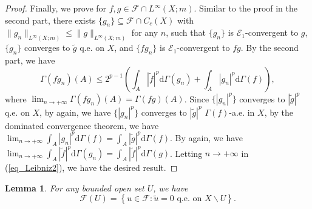 \documentclass[11pt,a4paper]{article}
\numberwithin{equation}{section}
\theoremstyle{plain}
\newtheorem{lemma}[theorem]{Lemma}
\theoremstyle{definition}
\begin{document}
\begin{proof}
Finally, we prove for $f,g\in\mathcal{F}\cap L^\infty(X;m)$. Similar to the proof in the second part, there exists $\{g_n\}\subseteq\mathcal{F}\cap C_c(X)$ with $\lVert {g_n}\rVert_{L^\infty(X;m)}\le \lVert {g}\rVert_{L^\infty(X;m)}$ for any $n$, such that $\{g_n\}$ is $\mathcal{E}_1$-convergent to $g$, $\{g_n\}$ converges to $\widetilde{g}$ q.e. on $X$, and $\{fg_n\}$ is $\mathcal{E}_1$-convergent to $fg$. By the second part, we have
\begin{equation}\label{eq_Leibniz2}
\Gamma(fg_n)(A)\le2^{p-1}\left(\int_A|\widetilde{f}|^p\mathrm{d}\Gamma(g_n)+\int_A|g_n|^p\mathrm{d}\Gamma(f)\right),
\end{equation}
where $\lim_{n\to+\infty}\Gamma(fg_n)(A)=\Gamma(fg)(A)$. Since $\{|g_n|^p\}$ converges to $|\widetilde{g}|^p$ q.e. on $X$, by \cite[Proposition 8.12]{Yan25a} again, we have $\{|g_n|^p\}$ converges to $|\widetilde{g}|^p$ $\Gamma(f)$-a.e. in $X$, by the dominated convergence theorem, we have $\lim_{n\to+\infty}\int_A|g_n|^p\mathrm{d}\Gamma(f)=\int_A|\widetilde{g}|^p\mathrm{d}\Gamma(f)$. By \cite[Proposition 4.9]{KS24a} again, we have $\lim_{n\to+\infty}\int_A|\widetilde{f}|^p\mathrm{d}\Gamma(g_n)=\int_A|\widetilde{f}|^p\mathrm{d}\Gamma(g)$. Letting $n\to+\infty$ in (\ref{eq_Leibniz2}), we have the desired result.
\end{proof}

\begin{lemma}\label{lem_calFU}
For any bounded open set $U$, we have
$$\mathcal{F}(U)=\left\{u\in\mathcal{F}:\widetilde{u}=0\text{ q.e. on }X\backslash U\right\}.$$
\end{lemma}
\end{document}
